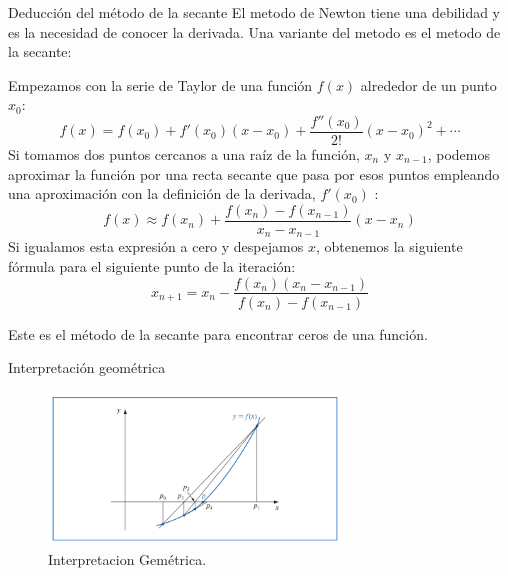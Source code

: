\documentclass{beamer}
\begin{document}
\begin{frame}{Deducción del método de la secante}
  El metodo de Newton tiene una debilidad y es la necesidad de 
   conocer la derivada. Una variante del metodo es el metodo de la secante:
   
  Empezamos con la serie de Taylor de una función $f(x)$ alrededor de un punto $x_0$:
  \pause
  $$f(x) = f(x_0) + f'(x_0)(x-x_0) + \frac{f''(x_0)}{2!}(x-x_0)^2 + \cdots$$
  \pause
  Si tomamos dos puntos cercanos a una raíz de la función, $x_n$ y $x_{n-1}$, podemos aproximar la función por una recta secante que pasa por esos puntos empleando una aproximación con la definición de la derivada,  $f'(x_0)$  :
  \pause
  $$f(x) \approx f(x_n) + \frac{f(x_n)-f(x_{n-1})}{x_n-x_{n-1}}(x-x_n)$$
  \pause
  Si igualamos esta expresión a cero y despejamos $x$, obtenemos la siguiente fórmula para el siguiente punto de la iteración:
  \pause
  $$x_{n+1} = x_n - \frac{f(x_n)(x_n-x_{n-1})}{f(x_n)-f(x_{n-1})}$$
  
  Este es el método de la secante para encontrar ceros de una función.
\end{frame}

\begin{frame}{Interpretación geométrica}
    \begin{figure} 
\includegraphics[width=0.7\textwidth]{secante.png} \caption{Interpretacion Gemétrica.} \end{figure} 
\end{frame}
\end{document}
